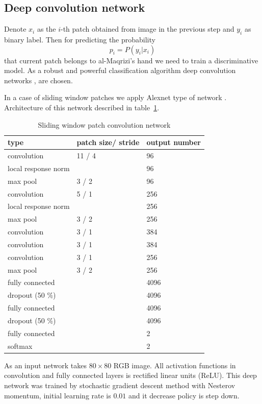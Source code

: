 \documentclass[conference,a4paper,twocolumn]{IEEEtran}
\begin{document}
\subsection{Deep convolution network}

Denote $x_i$ as the $i$-th patch obtained from image in the previous step and $y_i$ as binary label. Then for predicting the probability
\begin{equation*}
	p_i = P(y_i | x_i)
\end{equation*}
that current patch belongs to al-Maqrizi's hand we need to train a discriminative model. As a robust and powerful classification algorithm deep convolution networks \cite{DL}, \cite{CNN} are chosen. 

In a case of sliding window patches we apply Alexnet type of network \cite{Alexnet}. Architecture of this network described in table~\ref{alexnet_tab}.
\begin{table}[!h]
\centering
\caption{Sliding window patch convolution network}
\label{alexnet_tab}
\begin{tabular}{|l|p{1.3cm}|p{1.3cm}|}
\hline
\textbf{type} & \textbf{patch size/ stride} & \textbf{output number}  \\
\hline
convolution & 11 / 4 & 96 \\
\hline
local response norm & & 96 \\
\hline
max pool & 3 / 2 & 96 \\
\hline
convolution & 5 / 1 & 256 \\
\hline
local response norm & & 256 \\
\hline
max pool & 3 / 2 & 256 \\
\hline
convolution & 3 / 1 & 384 \\
\hline
convolution & 3 / 1 & 384 \\
\hline
convolution & 3 / 1 & 256 \\
\hline
max pool & 3 / 2 & 256 \\
\hline
fully connected & & 4096 \\
\hline
dropout (50 \%) & & 4096 \\
\hline
fully connected & & 4096 \\
\hline
dropout (50 \%) & & 4096 \\
\hline
fully connected & & 2 \\
\hline
softmax & & 2 \\
\hline
\end{tabular}
\end{table}

As an input network takes $80\times80$ RGB image. All activation functions in convolution and fully connected layers is rectified linear units (ReLU). This deep network was trained by stochastic gradient descent method with Nesterov momentum, initial learning rate is $0.01$ and it decrease policy is step down.
\end{document}
